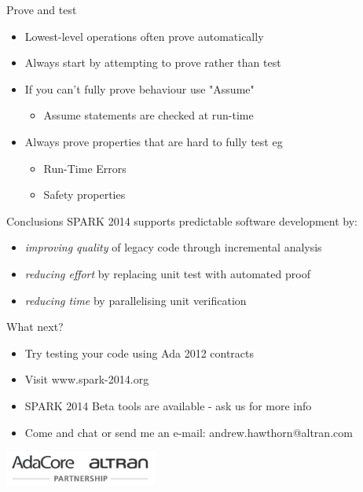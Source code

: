 \documentclass{beamer}
\begin{document}




\begin{frame}[fragile]{Prove and test}
  \begin{itemize}
     \item Lowest-level operations often prove automatically
     \item Always start by attempting to prove rather than test
     \item If you can't fully prove behaviour use "Assume"
     \begin{itemize}
        \item Assume statements are checked at run-time
     \end{itemize}
     \item Always prove properties that are hard to fully test eg
     \begin{itemize}
        \item Run-Time Errors 
        \item Safety properties
     \end{itemize}
     
  \end{itemize}
\end{frame}



\begin{frame}[fragile]{Conclusions}
  SPARK 2014 supports predictable software development by:
  \begin{itemize}
     \item \emph{improving quality} of legacy code through incremental analysis
     \item \emph{reducing effort} by replacing unit test with automated proof
     \item \emph{reducing time} by parallelising unit verification
  \end{itemize}

  \vspace{0.3cm}

  What next?
  \begin{itemize}
     \item Try testing your code using Ada 2012 contracts
     \item Visit www.spark-2014.org
     \item SPARK 2014 Beta tools are available - ask us for more info
     \item Come and chat or send me an e-mail: andrew.hawthorn@altran.com
  \end{itemize}

  \begin{center}
     \includegraphics[width=5cm]{partnership_logo_big.png}
  \end{center}
\end{frame}
\end{document}
